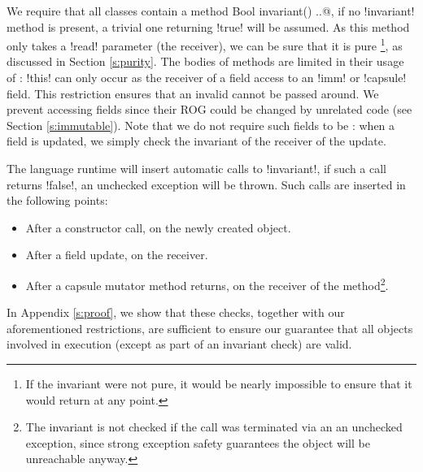 We require that all classes contain a \Q@read method Bool invariant() {..}@, if no \Q!invariant! method is present, a trivial one returning \Q!true! will be assumed. As this method only takes a \Q!read! parameter (the receiver), we can be sure that it is pure \footnote{If the invariant were not pure, it would be nearly impossible to ensure that it would return \Q@true@ at any point.}, as discussed in Section \ref{s:purity}.
The bodies of \Q@invariant@ methods are limited in their usage of \Q@this@: \Q!this! can only occur as the receiver of a field access to an \Q!imm! or \Q!capsule! field. This restriction ensures that 
an invalid \Q@this@ cannot be passed around.
We prevent accessing \Q@mut@ fields since their ROG could be changed by unrelated code (see Section \ref{s:immutable}).
Note that we do not require such fields to be \Q@final@: when a field is updated, we simply check the invariant of the receiver of the update.

The language runtime will insert automatic calls to \Q!invariant!, if such a call returns \Q!false!, an unchecked exception will be thrown. Such calls are inserted in the following points:
\begin{itemize}
	\item After a constructor call, on the newly created object.
	\item After a field update, on the receiver.
	\item After a capsule mutator method returns, on the receiver of the method\footnote{The invariant is not checked if the call was terminated via an an unchecked exception, since strong exception safety guarantees the object will be unreachable anyway.}.
\end{itemize}

\noindent In Appendix \ref{s:proof}, we show that these checks, together with our aforementioned restrictions, are sufficient to ensure our guarantee that all objects involved in execution (except as part of an invariant check) are valid.

